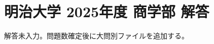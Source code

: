 \documentclass[../../uem_mat_mei_a.tex]{subfiles}
\begin{document}
    \section{明治大学 2025年度 商学部 解答}

    解答未入力。問題数確定後に大問別ファイルを追加する。
\end{document}

